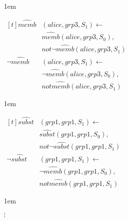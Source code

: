 \documentclass[global,twocolumn,final]{svjour}
\newenvironment{vexample}
  {\begin{example}\hspace{0.25em}}
  {\end{example}}
\newenvironment{vquote}
  {\begin{list}{}{\leftmargin 1em}\item[]}
  {\end{list}}
\begin{document}
\begin{vexample}
\begin{enumerate}
              \begin{vquote}
                \begin{math}
                  \begin{aligned}[t]
                    \hat{memb}&(alice, grp3, S_{1}) \leftarrow \\
                    & \hat{memb}(alice, grp3, S_{0}), \\
                    & not \lnot \hat{memb}(alice, grp3, S_{1}) \\
                    \lnot \hat{memb}&(alice, grp3, S_{1}) \leftarrow \\
                    & \lnot \hat{memb}(alice, grp3, S_{0}), \\
                    & not \hat{memb}(alice, grp3, S_{1})
                  \end{aligned}
                \end{math}
              \end{vquote}

              \begin{vquote}
                \begin{math}
                  \begin{aligned}[t]
                    \hat{subst}&(grp1, grp1, S_{1}) \leftarrow \\
                    & \hat{subst}(grp1, grp1, S_{0}), \\
                    & not \lnot \hat{subst}(grp1, grp1, S_{1}) \\
                    \lnot \hat{subst}&(grp1, grp1, S_{1}) \leftarrow \\
                    & \lnot \hat{memb}(grp1, grp1, S_{0}), \\
                    & not \hat{memb}(grp1, grp1, S_{1})
                  \end{aligned}
                \end{math}
              \end{vquote}

              \begin{vquote}
                \hspace{5em}$\vdots$
              \end{vquote}


\end{enumerate}
\end{vexample}
\end{document}
